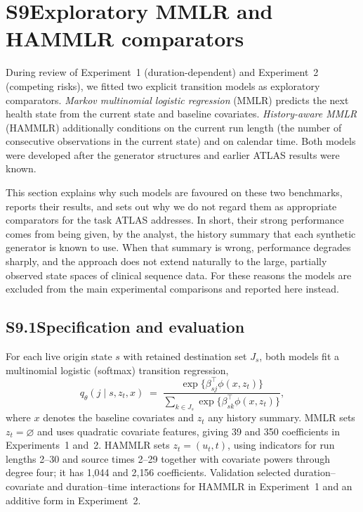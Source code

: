 \documentclass[11pt]{article}
\begin{document}
\setcounter{proposition}{2}
\setcounter{table}{11}
\pagestyle{empty}

\section*{S9\quad Exploratory MMLR and HAMMLR comparators}

During review of Experiment~1 (duration-dependent) and Experiment~2 (competing risks), we fitted two explicit transition models as exploratory comparators. \emph{Markov multinomial logistic regression} (MMLR) predicts the next health state from the current state and baseline covariates. \emph{History-aware MMLR} (HAMMLR) additionally conditions on the current run length (the number of consecutive observations in the current state) and on calendar time. Both models were developed after the generator structures and earlier ATLAS results were known.

This section explains why such models are favoured on these two benchmarks, reports their results, and sets out why we do not regard them as appropriate comparators for the task ATLAS addresses. In short, their strong performance comes from being given, by the analyst, the history summary that each synthetic generator is known to use. When that summary is wrong, performance degrades sharply, and the approach does not extend naturally to the large, partially observed state spaces of clinical sequence data. For these reasons the models are excluded from the main experimental comparisons and reported here instead.

\subsection*{S9.1\quad Specification and evaluation}

For each live origin state $s$ with retained destination set $J_s$, both models fit a multinomial logistic (softmax) transition regression,
\begin{equation}
q_\theta(j \mid s, z_t, x) \;=\; \frac{\exp\{\beta_{sj}^{\top}\phi(x, z_t)\}}{\sum_{k\in J_s}\exp\{\beta_{sk}^{\top}\phi(x, z_t)\}},
\label{eq:softmax}
\end{equation}
where $x$ denotes the baseline covariates and $z_t$ any history summary. MMLR sets $z_t=\varnothing$ and uses quadratic covariate features, giving 39 and 350 coefficients in Experiments~1 and~2. HAMMLR sets $z_t=(u_t,t)$, using indicators for run lengths 2--30 and source times 2--29 together with covariate powers through degree four; it has 1{,}044 and 2{,}156 coefficients. Validation selected duration--covariate and duration--time interactions for HAMMLR in Experiment~1 and an additive form in Experiment~2.
\end{document}
